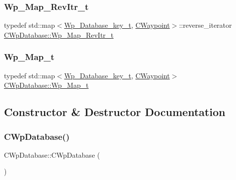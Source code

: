 \mbox{\label{classCWpDatabase_ae28984b70adcf73331968295206fba5d}} 
\subsubsection{\texorpdfstring{Wp\+\_\+\+Map\+\_\+\+Rev\+Itr\+\_\+t}{Wp\_Map\_RevItr\_t}}
{\footnotesize\ttfamily typedef std\+::map$<$\hyperlink{CWpDatabase_8h_af4bde7780fd7a000e6647ae788fe5a10}{Wp\+\_\+\+Database\+\_\+key\+\_\+t}, \hyperlink{classCWaypoint}{C\+Waypoint}$>$\+::reverse\+\_\+iterator \hyperlink{classCWpDatabase_ae28984b70adcf73331968295206fba5d}{C\+Wp\+Database\+::\+Wp\+\_\+\+Map\+\_\+\+Rev\+Itr\+\_\+t}}

\mbox{\label{classCWpDatabase_acdf43fd8206955eeb54807e9254958cb}} 
\subsubsection{\texorpdfstring{Wp\+\_\+\+Map\+\_\+t}{Wp\_Map\_t}}
{\footnotesize\ttfamily typedef std\+::map$<$\hyperlink{CWpDatabase_8h_af4bde7780fd7a000e6647ae788fe5a10}{Wp\+\_\+\+Database\+\_\+key\+\_\+t}, \hyperlink{classCWaypoint}{C\+Waypoint}$>$ \hyperlink{classCWpDatabase_acdf43fd8206955eeb54807e9254958cb}{C\+Wp\+Database\+::\+Wp\+\_\+\+Map\+\_\+t}}



\subsection{Constructor \& Destructor Documentation}
\mbox{\label{classCWpDatabase_a373c0ba6b4524115cda152273a713017}} 
\subsubsection{\texorpdfstring{C\+Wp\+Database()}{CWpDatabase()}}
{\footnotesize\ttfamily C\+Wp\+Database\+::\+C\+Wp\+Database (\begin{DoxyParamCaption}{ }\end{DoxyParamCaption})}

